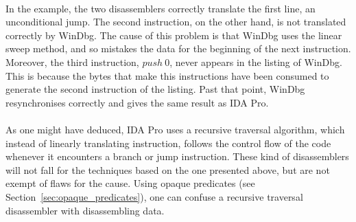 \paragraph{}
In the example, the two disassemblers correctly translate the first line, an unconditional jump. The second instruction, on the other hand, is not translated correctly by WinDbg. The cause of this problem is that WinDbg uses the linear sweep method, and so mistakes the data for the beginning of the next instruction. Moreover, the third instruction, $push\ 0$, never appears in the listing of WinDbg. This is because the bytes that make this instructions have been consumed to generate the second instruction of the listing. Past that point, WinDbg resynchronises correctly and gives the same result as IDA Pro.

\paragraph{}
As one might have deduced, IDA Pro uses a recursive traversal algorithm, which instead of linearly translating instruction, follows the control flow of the code whenever it encounters a branch or jump instruction. These kind of disassemblers will not fall for the techniques based on the one presented above, but are not exempt of flaws for the cause. Using opaque predicates (see Section~\ref{sec:opaque_predicates}), one can confuse a recursive traversal disassembler with disassembling data.
